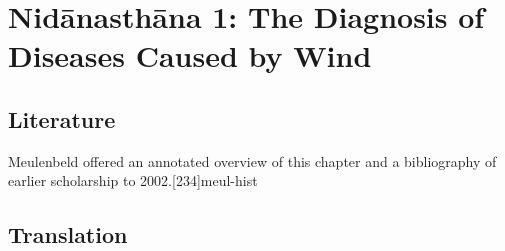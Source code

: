 
\chapter{Nidānasthāna 1: The Diagnosis of Diseases Caused 
by Wind}


\section{Literature}

Meulenbeld offered an annotated overview of this chapter and a
bibliography of earlier scholarship to 2002.[234]{meul-hist}


\section{Translation}

